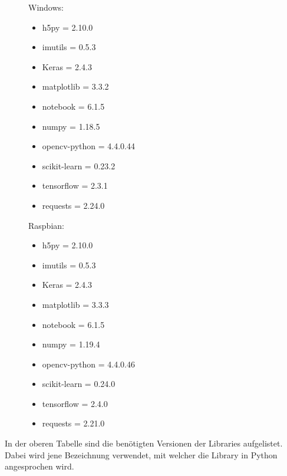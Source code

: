 \begin{figure}[htbp]
    \centering
    \begin{minipage}[t]{0.45\linewidth}
        Windows:
        \begin{itemize}
            \item h5py = 2.10.0
            \item imutils = 0.5.3
            \item Keras = 2.4.3
            \item matplotlib = 3.3.2
            \item notebook = 6.1.5
            \item numpy = 1.18.5
            \item opencv-python = 4.4.0.44
            \item scikit-learn = 0.23.2
            \item tensorflow = 2.3.1
            \item requests = 2.24.0
        \end{itemize}
    \end{minipage}
    \hfill
    \begin{minipage}[t]{0.45\linewidth}
        Raspbian:
        \begin{itemize}
            \item h5py = 2.10.0
            \item imutils = 0.5.3
            \item Keras = 2.4.3
            \item matplotlib = 3.3.3
            \item notebook = 6.1.5
            \item numpy = 1.19.4
            \item opencv-python = 4.4.0.46
            \item scikit-learn = 0.24.0
            \item tensorflow = 2.4.0
            \item requests = 2.21.0
        \end{itemize}
    \end{minipage}
\end{figure}

In der oberen Tabelle sind die benötigten Versionen der Libraries aufgelistet. Dabei wird jene Bezeichnung verwendet, mit welcher die Library in Python angesprochen wird.

